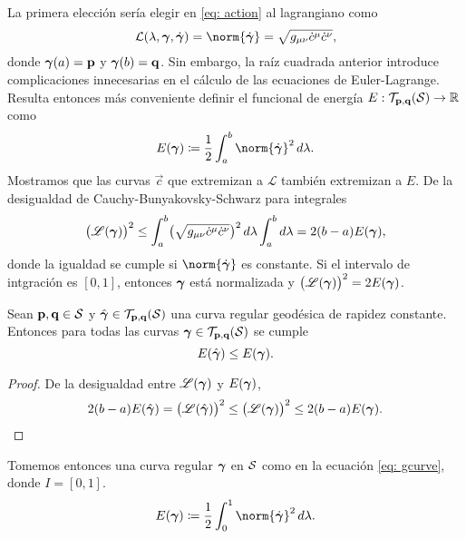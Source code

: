 La primera elección sería elegir en \eqref{eq: action} al lagrangiano como
\begin{equation}
	\mathcal L(\lambda, \bgamma, \dot{\bgamma}) = \norm{\dot{\bgamma}} = \sqrt{g_{\mu\nu} \dot c^\mu \dot c^\nu},
\end{equation}
donde $\boldsymbol{\gamma}(a) = \mathbf p$ y $\boldsymbol{\gamma}(b) = \mathbf q$.
Sin embargo, la raíz cuadrada anterior introduce complicaciones innecesarias en el cálculo de las ecuaciones de Euler-Lagrange. Resulta entonces más conveniente definir el funcional de energía $E: {\mathcal T}_{\mathbf p, \mathbf q}(\mathcal S) \to \mathbb R$ como \parencite{carmo-1974}
\begin{equation}
	E(\bgamma) \coloneqq \frac{1}{2}\int_a^b \norm{\dot{\bgamma}}^2 \, d\lambda.
\end{equation}
Mostramos que las curvas $\vec c$ que extremizan a $\mathscr L$ también extremizan a $E$.
De la desigualdad de Cauchy-Bunyakovsky-Schwarz para integrales
\begin{equation}
	\bigl( \mathscr L(\boldsymbol{\gamma})\bigr)^2 \le \int_{a}^{b} \bigl(\sqrt{
			g_{\mu\nu} \dot c^\mu \dot c^\nu
		}\bigr)^2\, d\lambda \int_a^b d\lambda
		= 2(b-a)E(\boldsymbol{\gamma}),
\end{equation}
donde la igualdad se cumple si $\norm{\dot{\bgamma}}$ es constante. Si el intervalo de intgración es $[0,1]$, entonces $\boldsymbol{\gamma}$ está normalizada y $\bigl( \mathscr L(\boldsymbol{\gamma})\bigr)^2 = 2E(\boldsymbol{\gamma})$.

\begin{lemma}
	Sean $\mathbf p,\mathbf q \in \mathcal S$ y $ \hat{\boldsymbol{\gamma}} \in \mathcal T_{\mathbf p, \mathbf q}(\mathcal S)$ una curva regular geodésica de rapidez constante. Entonces para todas las curvas $\boldsymbol{\gamma} \in \mathcal T_{\mathbf p, \mathbf q}(\mathcal S)$ se cumple
	\begin{equation}
		E(\hat{\boldsymbol{\gamma}}) \le E(\boldsymbol{\gamma}).
	\end{equation}
\end{lemma}
\begin{proof}
	De la desigualdad entre $\mathscr L(\boldsymbol{\gamma})$ y $E(\boldsymbol{\gamma})$,
	\begin{equation}
		2(b-a)E(\hat{\boldsymbol{\gamma}}) = \bigl( \mathscr L(\hat{\boldsymbol{\gamma}})\bigr)^2 \le \bigl( \mathscr L(\boldsymbol{\gamma})\bigr)^2 \le 2(b-a)E(\boldsymbol{\gamma}).
	\end{equation}
\end{proof}

Tomemos entonces una curva regular $\boldsymbol{\gamma}$ en $\mathcal S$ como en la ecuación \eqref{eq: gcurve}, donde $I = [0,1]$.
\begin{equation}
	E(\bgamma) \coloneqq \frac{1}{2}\int_0^1 \norm{\dot{\bgamma}}^2 \, d\lambda.
\end{equation}

